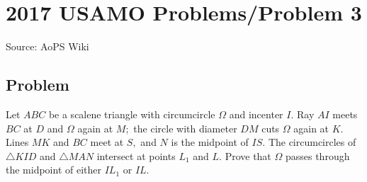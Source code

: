 \documentclass[12pt]{article}
\begin{document}
\section*{{2017 USAMO Problems/Problem 3}}
Source: AoPS Wiki

\subsection*{Problem}
Let $ABC$ be a scalene triangle with circumcircle $\Omega$ and incenter $I.$ Ray $AI$ meets $BC$ at $D$ and $\Omega$ again at $M;$ the circle with diameter $DM$ cuts $\Omega$ again at $K.$ Lines $MK$ and $BC$ meet at $S,$ and $N$ is the midpoint of $IS.$ The circumcircles of $\triangle KID$ and $\triangle MAN$ intersect at points $L_1$ and $L.$ Prove that $\Omega$ passes through the midpoint of either $IL_1$ or $IL.$
\end{document}
